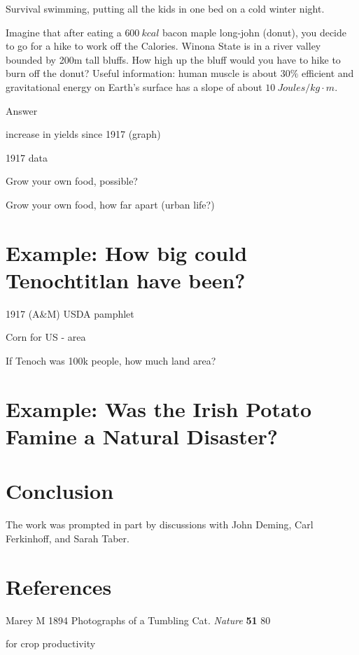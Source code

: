\documentclass[12pt]{iopart}
\begin{document}
Survival swimming, putting all the kids in one bed on a cold winter night.

Imagine that after eating a $600~kcal$ bacon maple long-john (donut), you decide to go for a hike to work off the Calories.  Winona State  is in a river valley bounded by 200m tall bluffs.  How high up the bluff would you have to hike to burn off the donut?  
Useful information: human muscle is about $30\%$ efficient and gravitational energy on Earth's surface has a slope of about $10~Joules/kg\cdot m$.

Answer


increase in yields since 1917 (graph)

1917 data

Grow your own food, possible?  

Grow your own food, how far apart (urban life?)


\section{Example: How big could Tenochtitlan have been?}

1917 (A&M) USDA pamphlet

Corn for US - area

If Tenoch was 100k people, how much land area?

\section{Example: Was the Irish Potato Famine a Natural Disaster?}

\section{Conclusion}


\ack
The work was prompted in part by discussions with John Deming, Carl Ferkinhoff, and Sarah Taber.



\section*{References}
\begin{thebibliography}{99}

Marey M
1894
Photographs of a Tumbling Cat. 
{\it Nature }
{\bf 51} 
80

 for crop productivity


\end{thebibliography}
\end{document}
